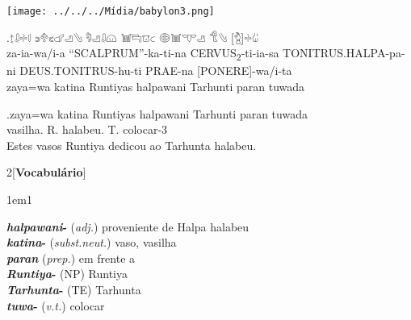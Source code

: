 \clearpage

\begin{center}
	\texttt{[image: ../../../Mídia/babylon3.png]}
\end{center}
\exg.{\Large 𔖪𔓱𔗬𔗷} {\Large 𔗎𔔯𔗏𔗧𔑣𔐤} {\Large 𔑵𔑣𔓱𔗔} {\Large 𔓢𔑞𔕸𔗐} {\Large 𔖖𔓢𔕙𔑣}
{\Large 𔐎𔐤} {\Large [𔑇]𔗬𔑰}\\
za-ia-wa\slash{}i-a\hspace{10pt} ``SCALPRUM''-ka-ti-na\hspace{10pt}
CERVUS\textsubscript{2}-ti-ia-sa\hspace{10pt} TONITRUS.HALPA-pa-ni\hspace{10pt}
DEUS.TONITRUS-hu-ti\hspace{10pt} PRAE-na\hspace{10pt} [PONERE]-wa/i-ta\\
zaya=wa katina Runtiyas halpawani Tarhunti paran tuwada

\exg.zaya=wa katina Runtiyas halpawani Tarhunti paran tuwada\\
\Det{}\Acu{}\Pl{} vasilha.\Neut{}\Acu{}\Pl{} R.\Com{}\Nom{}\Sg{} halabeu.\Com{}\Dat{}\Sg{} T.\Com{}\Dat{}\Sg{} \Prep{} colocar-3\Sg\\
Estes vasos Runtiya dedicou ao Tarhunta halabeu.




\hspace{10pt}
\begin{multicols}{2}[\noindent\textbf{Vocabulário}]
	\begin{hangparas}{1em}{1}
		\raggedright%
		\textbf{\emph{halpawani}-} (\emph{adj.}) \tabto{1em} proveniente de Halpa \tabto{1em} halabeu\\
		\textbf{\emph{katina}-} (\emph{subst.neut.}) \tabto{1em} vaso, vasilha\\
		\textbf{\emph{paran}} (\emph{prep.}) \tabto{1em} em frente a\\
		\textbf{\emph{Runtiya}-} (NP) \tabto{1em} Runtiya\\
		\textbf{\emph{Tarhunta}-} (TE) \tabto{1em} Tarhunta\\
		\textbf{\emph{tuwa}-} (\emph{v.t.}) \tabto{1em} colocar\\
	\end{hangparas}
\end{multicols}
